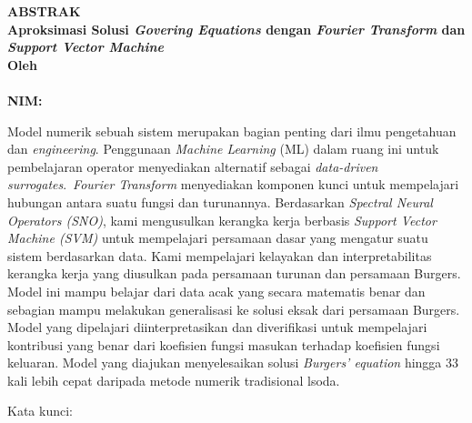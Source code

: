 \clearpage
{}
\begin{center}
\textbf{\large  ABSTRAK}\\[0.5cm]
\textbf{\large Aproksimasi Solusi \textit{Govering Equations} dengan \emph{Fourier Transform} dan \textit{Support Vector Machine}}\\[0.5cm]
\textbf{Oleh}\\
\textbf{\penulis}\\
\textbf{NIM:\@\nim}\\[2em]
\end{center}

\noindent Model numerik sebuah sistem merupakan bagian penting dari ilmu pengetahuan dan \textit{engineering}. Penggunaan \textit{Machine Learning} (ML) dalam ruang ini untuk pembelajaran operator menyediakan alternatif sebagai \textit{data-driven surrogates}.\ \textit{Fourier Transform} menyediakan komponen kunci untuk mempelajari hubungan antara suatu fungsi dan turunannya. Berdasarkan \textit{Spectral Neural Operators (SNO)}, kami mengusulkan kerangka kerja berbasis \textit{Support Vector Machine (SVM)} untuk mempelajari persamaan dasar yang mengatur suatu sistem berdasarkan data. Kami mempelajari kelayakan dan interpretabilitas kerangka kerja yang diusulkan pada persamaan turunan dan persamaan Burgers. Model ini mampu belajar dari data acak yang secara matematis benar dan sebagian mampu melakukan generalisasi ke solusi eksak dari persamaan Burgers. Model yang dipelajari diinterpretasikan dan diverifikasi untuk mempelajari kontribusi yang benar dari koefisien fungsi masukan terhadap koefisien fungsi keluaran. Model yang diajukan menyelesaikan solusi \textit{Burgers' equation} hingga 33 kali lebih cepat daripada metode numerik tradisional lsoda.




\noindent Kata kunci: \katakunci{}
